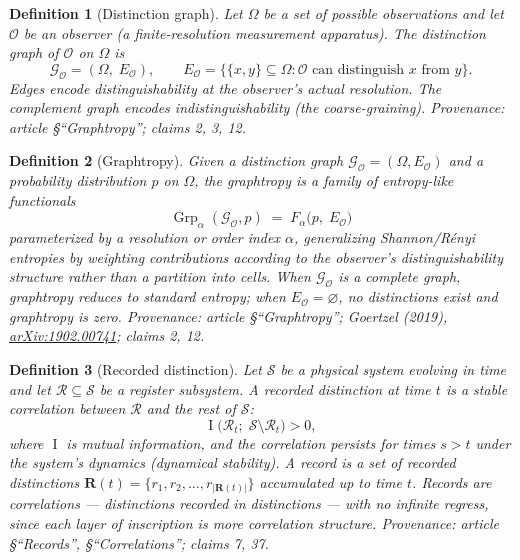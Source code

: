 \documentclass[11pt]{article}
\newtheorem{definition}{Definition}
\DeclareMathOperator{\Grp}{Grp}
\DeclareMathOperator{\MI}{I}
\newcommand{\cG}{\mathcal{G}}
\newcommand{\cO}{\mathcal{O}}
\newcommand{\cR}{\mathcal{R}}
\newcommand{\cS}{\mathcal{S}}
\begin{document}
\begin{definition}[Distinction graph]\label{def:dg}
Let $\Omega$ be a set of possible observations and let $\cO$ be an observer
(a finite-resolution measurement apparatus).  The \emph{distinction graph}
of $\cO$ on $\Omega$ is
\[
  \cG_\cO = (\Omega,\; E_\cO), \qquad
  E_\cO = \bigl\{\{x,y\} \subseteq \Omega : \cO \text{ can distinguish } x
  \text{ from } y \bigr\}.
\]
Edges encode distinguishability at the observer's actual resolution.
The complement graph encodes indistinguishability (the coarse-graining).
\emph{Provenance: article \S``Graphtropy''; claims 2, 3, 12.}
\end{definition}

\begin{definition}[Graphtropy]\label{def:graphtropy}
Given a distinction graph $\cG_\cO = (\Omega, E_\cO)$ and a probability
distribution $p$ on $\Omega$, the \emph{graphtropy} is a family of
entropy-like functionals
\[
  \Grp_\alpha(\cG_\cO, p) \;=\; F_\alpha\!\bigl(p,\; E_\cO\bigr)
\]
parameterized by a resolution or order index $\alpha$, generalizing
Shannon/R\'enyi entropies by weighting contributions according to the
observer's distinguishability structure rather than a partition into cells.
When $\cG_\cO$ is a complete graph, graphtropy reduces to standard entropy;
when $E_\cO = \varnothing$, no distinctions exist and graphtropy is zero.
\emph{Provenance: article \S``Graphtropy''; Goertzel (2019),
\href{https://arxiv.org/abs/1902.00741}{arXiv:1902.00741}; claims 2, 12.}
\end{definition}

\begin{definition}[Recorded distinction]\label{def:record}
Let $\cS$ be a physical system evolving in time and let $\cR \subseteq \cS$
be a register subsystem.  A \emph{recorded distinction} at time $t$ is a
stable correlation between $\cR$ and the rest of $\cS$:
\[
  \MI\!\bigl(\cR_t ;\; \cS \setminus \cR_t\bigr) > 0,
\]
where $\MI$ is mutual information, and the correlation persists for times
$s > t$ under the system's dynamics (dynamical stability).  A \emph{record}
is a set of recorded distinctions
$\mathbf{R}(t) = \bigl\{r_1, r_2, \ldots, r_{|\mathbf{R}(t)|}\bigr\}$
accumulated up to time $t$.  Records are correlations — distinctions
recorded in distinctions — with no infinite regress, since each layer of
inscription is more correlation structure.
\emph{Provenance: article \S``Records'', \S``Correlations''; claims 7, 37.}
\end{definition}
\end{document}
